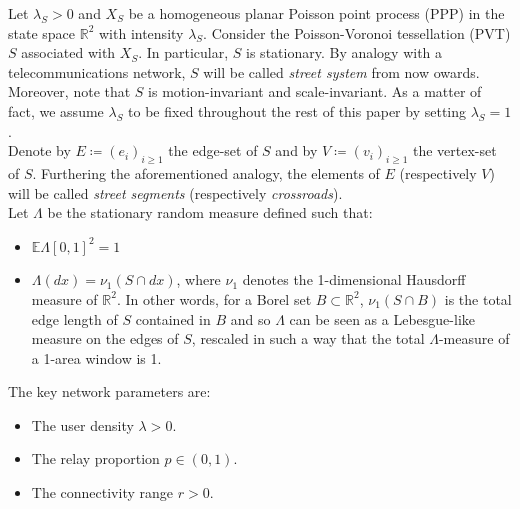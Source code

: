 \documentclass[10pt,a4paper]{amsart}
\theoremstyle{exampstyle}
\theoremstyle{exampnotations}
\begin{document}
Let $\lambda_{S} > 0$ and $X_{S}$ be a homogeneous planar Poisson point process (PPP) in the state space $\mathbb{R}^{2}$ with intensity $\lambda_S$. Consider the Poisson-Voronoi tessellation (PVT) $S$ associated with $X_S$. In particular, $S$ is stationary. By analogy with a telecommunications network, $S$ will be called \emph{street system} from now owards. Moreover, note that $S$ is motion-invariant and scale-invariant. As a matter of fact, we assume $\lambda_S$ to be fixed throughout the rest of this paper by setting $\lambda_S = 1$.  \\
\indent Denote by $E \coloneqq (e_{i})_{i \geq 1}$ the edge-set of $S$ and by $V \coloneqq (v_{i})_{i \geq 1}$ the vertex-set of $S$. Furthering the aforementioned analogy, the elements of $E$ (respectively $V$) will be called \emph{street segments} (respectively \emph{crossroads}). \\
\indent Let $\Lambda$ be the stationary random measure defined such that:
\begin{itemize}
\item $\mathbb{E} \Lambda \left[0,1\right]^{2} = 1$
\item $\Lambda(dx) = \nu_{1}(S \cap dx)$, where $\nu_{1}$ denotes the 1-dimensional Hausdorff measure of $\mathbb{R}^{2}$. In other words, for a Borel set $B \subset \mathbb{R}^2$, $\nu_{1}(S \cap B)$ is the total edge length of $S$ contained in  $B$ and so $\Lambda$ can be seen as a Lebesgue-like measure on the edges of $S$, rescaled in such a way that the total $\Lambda$-measure of a 1-area window is 1. \\
\end{itemize}

The key network parameters are:
\begin{itemize}
\item The user density $\lambda > 0$.
\item The relay proportion $p \in \left(0,1\right)$.
\item The connectivity range $r > 0$. \\
\end{itemize}
\end{document}
